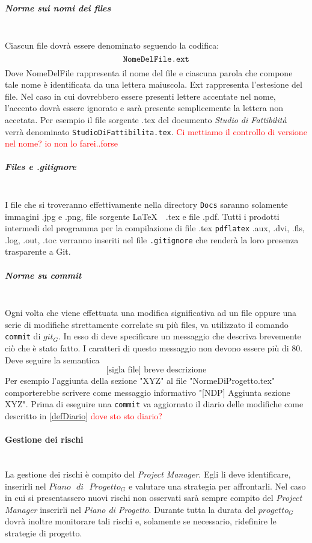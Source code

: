 			\subparagraph{Norme sui nomi dei files} \mbox{} \\
			Ciascun file dovrà essere denominato seguendo la codifica:
					$$\text{\texttt{NomeDelFile.ext}}$$
			Dove NomeDelFile rappresenta il nome del file e ciascuna parola che compone tale nome è identificata da una lettera maiuscola. Ext rappresenta l'estesione del file. Nel caso in cui dovrebbero essere presenti lettere accentate nel nome, l'accento dovrà essere ignorato e sarà presente semplicemente la lettera non accetata. Per esempio il file sorgente .tex del documento \emph{Studio di Fattibilità} verrà denominato \texttt{StudioDiFattibilita.tex}. \textcolor{red}{Ci mettiamo il controllo di versione nel nome? io non lo farei..forse}
			
			\subparagraph{Files e .gitignore}\mbox{} \\
			I file che si troveranno effettivamente nella directory \texttt{Docs} saranno solamente immagini .jpg e .png, file sorgente \LaTeX $\text{ }$ .tex e file .pdf. Tutti i prodotti intermedi del programma per la compilazione di file .tex \texttt{pdflatex} .aux, .dvi, .fls, .log, .out, .toc verranno inseriti nel file \texttt{.gitignore} che renderà la loro presenza trasparente a Git.
			
			\subparagraph{Norme su commit}\mbox{} \\
			Ogni volta che viene effettuata una modifica significativa ad un file oppure una serie di modifiche strettamente correlate su più files, va utilizzato il comando \texttt{commit} di $git_G$. In esso di deve specificare un messaggio che descriva brevemente ciò che è stato fatto. I caratteri di questo messaggio non devono essere più di 80. Deve seguire la semantica
			$$\text{[sigla file] breve descrizione}$$
			Per esempio l'aggiunta della sezione "XYZ" al file "NormeDiProgetto.tex" comporterebbe scrivere come messaggio informativo "[NDP] Aggiunta sezione XYZ". Prima di eseguire una \texttt{commit} va aggiornato il diario delle modifiche come descritto in \ref{defDiario} \textcolor{red}{dove sto sto diario?} 
			
		\paragraph{Gestione dei rischi} \mbox{} \\
		La gestione dei rischi è compito del \emph{Project Manager}. Egli li deve identificare, inserirli nel $Piano\text{ }di\text{ }Progetto_G$ e valutare una strategia per affrontarli. Nel caso in cui si presentassero nuovi rischi non osservati sarà sempre compito del \emph{Project Manager} inserirli nel \emph{Piano di Progetto}. Durante tutta la durata del $progetto_G$ dovrà inoltre monitorare tali rischi e, solamente se necessario, ridefinire le strategie di progetto.
		
